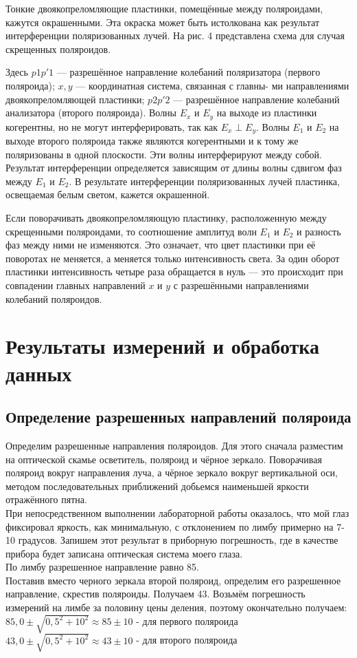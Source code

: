 \documentclass[a4paper]{article}
\begin{document}
Тонкие двоякопреломляющие пластинки, помещённые между поляроидами, кажутся окрашенными. Эта окраска может быть истолкована как результат интерференции поляризованных лучей. На рис. 4 представлена схема для
случая скрещенных поляроидов.

Здесь $ p1p'1 $ --- разрешённое направление колебаний поляризатора
(первого поляроида); $ x, y $ --- координатная система, связанная с главны-
ми направлениями двоякопреломляющей пластинки; $ p2p'2 $ --- разрешённое направление колебаний анализатора (второго поляроида). Волны
$ E_x  $ и $ E_y $ на выходе из пластинки когерентны, но не могут интерферировать, так как $ E_x \perp  E_y $. Волны $ E_1 $ и $ E_2 $ на выходе второго поляроида
также являются когерентными и к тому же поляризованы в одной плоскости. Эти волны интерферируют между собой. Результат интерференции определяется зависящим от длины волны сдвигом фаз между $ E_1 $
и $ E_2 $. В результате интерференции поляризованных лучей пластинка, освещаемая белым светом, кажется окрашенной.

Если поворачивать двоякопреломляющую пластинку, расположенную между
скрещенными поляроидами, то соотношение амплитуд волн $ E_1 $ и $ E_2 $ и разность фаз между ними не изменяются. Это означает, что цвет пластинки при её поворотах не меняется, а меняется только интенсивность света. За один оборот пластинки интенсивность четыре раза обращается в нуль --- это происходит при совпадении главных направлений
$ x $ и $ y $ с разрешёнными направлениями колебаний поляроидов.


\section{Результаты измерений и обработка данных}

\subsection{Определение разрешенных направлений поляроида}
Определим разрешенные направления поляроидов. Для этого сначала разместим на оптической скамье осветитель, поляроид и чёрное зеркало. Поворачивая поляроид вокруг направления луча, а чёрное зеркало вокруг вертикальной оси, методом последовательных приближений добьемся наименьшей яркости отражённого пятна.\\
При непосредственном выполнении лабораторной работы оказалось, что мой глаз фиксировал яркость, как минимальную, с отклонением по лимбу примерно на 7-10 градусов. Запишем этот результат в приборную погрешность, где в качестве прибора будет записана оптическая система моего глаза.\\ 
По лимбу разрешенное направление равно 85.\\
Поставив вместо черного зеркала второй поляроид, определим его разрешенное направление, скрестив поляроиды. Получаем 43.  
Возьмём погрешность измерений на лимбе за половину цены деления, поэтому окончательно получаем:\\
$85,0 \pm \sqrt{0,5^2 + 10^2} \approx 85 \pm 10 $ - для первого поляроида\\
$43,0 \pm \sqrt{0,5^2 + 10^2} \approx 43 \pm 10$ - для второго поляроида\\
 
\end{document}
